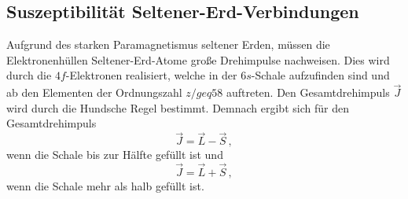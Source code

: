 \subsection{Suszeptibilität Seltener-Erd-Verbindungen}
\label{sec:Suszeptibilität_Selterner_Erden}
Aufgrund des starken Paramagnetismus seltener Erden, müssen die Elektronenhüllen Seltener-Erd-Atome große Drehimpulse
nachweisen. Dies wird durch die $4f$-Elektronen realisiert, welche in der $6s$-Schale aufzufinden sind und ab den Elementen
der Ordnungszahl $z /geq 58$ auftreten. Den Gesamtdrehimpuls $\vec{J}$ wird durch die Hundsche Regel bestimmt. Demnach ergibt sich für den Gesamtdrehimpuls
\begin{equation}
    \vec{J}=\vec{L} - \vec{S}\,,
    \label{eqn:HundscheRegel_minus}
\end{equation}
wenn die Schale bis zur Hälfte gefüllt ist und 
\begin{equation}
    \vec{J}=\vec{L} + \vec{S}\,,
    \label{eqn:HundscheRegel_plus}
\end{equation}
wenn die Schale mehr als halb gefüllt ist.

